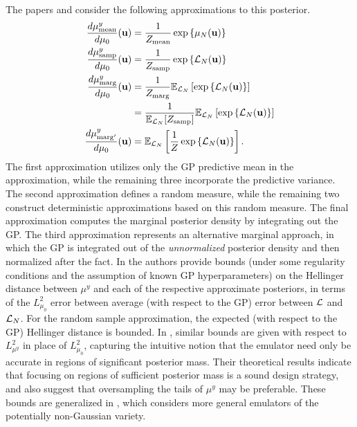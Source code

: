 \documentclass[12pt]{article}
\begin{document}
The papers \cite{StuartTeck1} and \cite{StuartTeck2} consider the following approximations to this posterior. 
\begin{align}
\frac{d\mu^y_{\text{mean}}}{d\mu_0}(\bpar) &= \frac{1}{Z_{\text{mean}}} \exp\left\{\GPMeanPred[\Ndesign](\bpar) \right\} \\
\frac{d\mu^y_{\text{samp}}}{d\mu_0}(\bpar) &= \frac{1}{Z_{\text{samp}}} \exp\left\{\llik_{\Ndesign}(\bpar)\right\} \\
\frac{d\mu^y_{\text{marg}}}{d\mu_0}(\bpar) &= \frac{1}{Z_{\text{marg}}}  \E_{\llik_{\Ndesign}}\left[\exp\left\{\llik_{\Ndesign}(\bpar)\right\}\right] \\
 							      &=  \frac{1}{\E_{\llik_{\Ndesign}}[Z_{\text{samp}}]}  \E_{\llik_{\Ndesign}}\left[\exp\left\{\llik_{\Ndesign}(\bpar)\right\}\right] \nonumber \\
\frac{d\mu^y_{\text{marg}^\prime}}{d\mu_0}(\bpar) &= \E_{\llik_{\Ndesign}}\left[\frac{1}{Z} \exp\left\{\llik_{\Ndesign}(\bpar)\right\}\right].
\end{align}
The first approximation utilizes only the GP predictive mean in the approximation, while the remaining three incorporate the predictive variance. 
The second approximation defines a random measure, while the remaining two construct deterministic approximations based on this random measure. 
The final approximation computes the marginal posterior density by integrating out the GP. The third approximation represents an alternative marginal 
approach, in which the GP is integrated out of the \textit{unnormalized} posterior density and then normalized after the fact. In \cite{StuartTeck1} the authors
provide bounds (under some regularity conditions and the assumption of known GP hyperparameters)
on the Hellinger distance between $\mu^y$ and each of the respective approximate posteriors, in terms of the $L^2_{\mu_0}$ error between 
average (with respect to the GP) error between $\llik$ and $\llik_{\Ndesign}$. 
For the random sample approximation, the expected (with respect to the GP) Hellinger distance is bounded. In \cite{StuartTeck2}, similar bounds are given 
with respect to $L^2_{\mu^y}$ in place of $L^2_{\mu_0}$, capturing the intuitive notion that the emulator need only be accurate in regions of significant 
posterior mass. Their theoretical results indicate that focusing on regions of sufficient posterior mass is a sound design strategy, and also suggest that 
oversampling the tails of $\mu^y$ may be preferable. These bounds are generalized in \cite{random_fwd_models}, which considers more general 
emulators of the potentially non-Gaussian variety. 
\end{document}
